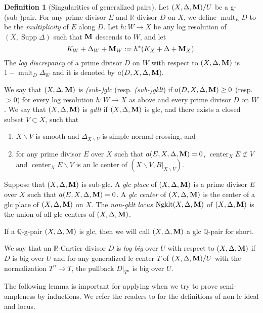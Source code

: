 \documentclass[11pt]{amsart}
\numberwithin{equation}{section}
\newcommand{\Mm}{{\bf{M}}}
\newcommand{\Qq}{\mathbb{Q}}
\newcommand{\Rr}{\mathbb{R}}
\newcommand{\Center}{\operatorname{center}}
\newcommand{\Supp}{\operatorname{Supp}}
\newcommand{\Ngklt}{\operatorname{Ngklt}}
\newcommand{\mult}{\operatorname{mult}}
\theoremstyle{definition}
\newtheorem{defn}[thm]{Definition}
\theoremstyle{definition}
\theoremstyle{definition}
\begin{document}
\begin{defn}[Singularities of generalized pairs]\label{defn: sing of g-pairs}
	Let $(X,\Delta,\Mm)/U$ be a g-(sub-)pair. For any prime divisor $E$ and $\mathbb R$-divisor $D$ on $X$, we define $\mult_{E}D$ to be the \emph{multiplicity} of $E$ along $D$.  Let $h:W\to X$
	be any log resolution of $(X,\Supp\Delta)$ such that $\Mm$ descends to $W$, and let
	$$K_W+\Delta_W+\Mm_W:=h^*(K_X+\Delta+\Mm_X).$$
	The \emph{log discrepancy} of a prime divisor $D$ on $W$ with respect to $(X,\Delta,\Mm)$ is $1-\mult_{D}\Delta_W$ and it is denoted by $a(D,X,\Delta,\Mm).$
	
	We say that $(X,\Delta,\Mm)$ is \emph{(sub-)glc} (resp. \emph{(sub-)gklt}) if $a(D,X,\Delta,\Mm)\ge0$ (resp. $>0$) for every log resolution $h: W\to X$ as above and every prime divisor $D$ on $W$. We say that $(X,\Delta,\Mm)$ is \emph{gdlt} if $(X,\Delta,\Mm)$ is glc, and there exists a closed subset $V\subset X$, such that
\begin{enumerate}
    \item $X\backslash V$ is smooth and $\Delta_{X\backslash V}$ is simple normal crossing, and
    \item for any prime divisor $E$ over $X$ such that $a(E,X,\Delta,\Mm)=0$, $\Center_XE\not\subset V$ and $\Center_XE\backslash V$ is an lc center of $(X\backslash V,B|_{X\backslash V})$.
\end{enumerate}
	    
	 Suppose that $(X,\Delta,\Mm)$ is sub-glc. A \emph{glc place} of $(X,\Delta,\Mm)$ is a prime divisor $E$ over $X$ such that $a(E,X,\Delta,\Mm)=0$. A \emph{glc center} of $(X,\Delta,\Mm)$ is the center of a glc place of $(X,\Delta,\Mm)$ on $X$. The \emph{non-gklt locus} $\Ngklt(X,\Delta,\Mm)$ of $(X,\Delta,\Mm)$ is the union of all glc centers of $(X,\Delta,\Mm)$.
	 
 If a $\Qq$-g-pair $(X,\Delta,\Mm)$ is glc, then we will call $(X,\Delta,\Mm)$ a glc $\Qq$-pair for short.
 
 We say that an $\Rr$-Cartier divisor $D$ is {\it log big} over $U$ with respect to $(X,\Delta,\Mm)$ if $D$ is big over $U$ and
for any generalized lc center $T$ of $(X,\Delta,\Mm)/U$ with the normalization $T^n\to T$, the
pullback $D|_{T^n}$ is big over $U$.
\end{defn}

The following lemma is important for applying \cite[Theorem 13.1]{Fuj11} when we try to prove semi-ampleness by inductions. We refer the readers to \cite[Section 7]{Fuj11} for the definitions of non-lc ideal and locus.
\end{document}

